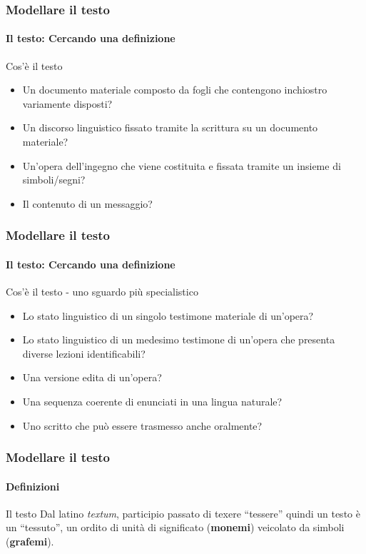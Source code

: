 \begin{frame}
	\frametitle{Modellare il testo}
	\framesubtitle{Il testo: Cercando una definizione}
	\addtocounter{nframe}{1}

	\begin{block}{Cos'è il testo}
		\begin{itemize}
			\item Un documento materiale composto da fogli che contengono inchiostro variamente disposti?
			\item Un discorso linguistico fissato tramite la scrittura su un documento materiale?
			\item Un’opera dell’ingegno che viene costituita e fissata tramite un insieme di simboli/segni?
			\item Il contenuto di un messaggio?
		\end{itemize}
	\end{block}
\end{frame}

\begin{frame}
	\frametitle{Modellare il testo}
	\framesubtitle{Il testo: Cercando una definizione}
	\addtocounter{nframe}{1}

	\begin{block}{Cos'è il testo - uno sguardo più specialistico}
		\begin{itemize}
			\item Lo stato linguistico di un singolo testimone materiale di un’opera?
			\item Lo stato linguistico di un medesimo testimone di un’opera che presenta diverse lezioni identificabili?
			\item Una versione edita di un’opera?
			\item Una sequenza coerente di enunciati in una lingua naturale?
			\item Uno scritto che può essere trasmesso anche oralmente?
		\end{itemize}
	\end{block}

\end{frame}

\begin{frame}
	\frametitle{Modellare il testo}
	\framesubtitle{Definizioni}
	\addtocounter{nframe}{1}

	\begin{block}{Il testo}
		Dal latino \textit{textum}, participio passato di texere ``tessere'' quindi un testo è un ``tessuto'', un ordito di unità di significato (\textbf{monemi}) veicolato da simboli (\textbf{grafemi}).
	\end{block}

\end{frame}

